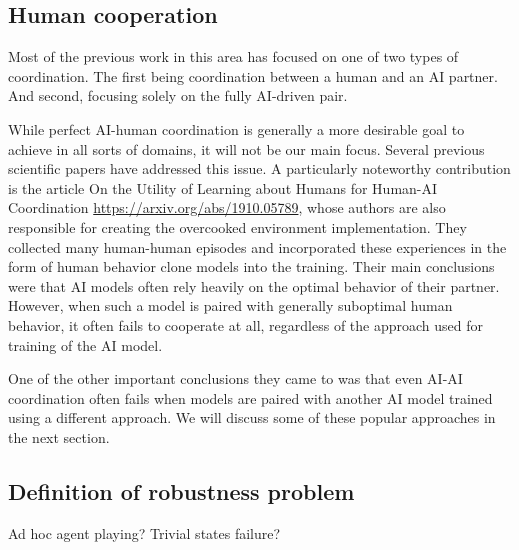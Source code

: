 \subsection{Human cooperation}
Most of the previous work in this area has focused on one of two types of coordination. 
The first being coordination between a human and an AI partner. 
And second, focusing solely on the fully AI-driven pair.

\par

While perfect AI-human coordination is generally a more desirable goal to achieve in all sorts of domains, it will not be our main focus.  
Several previous scientific papers have addressed this issue. A particularly noteworthy contribution is the article 
On the Utility of Learning about Humans for Human-AI Coordination
\url{https://arxiv.org/abs/1910.05789}, whose authors are also responsible for creating the overcooked environment implementation. 
They collected many human-human episodes and incorporated these experiences in the form of human behavior clone models into the training. Their main conclusions were that AI models often rely heavily on the optimal behavior of their partner. 
However, when such a model is paired with generally suboptimal human behavior, it often fails to cooperate at all, regardless of the approach used for training of the AI model.

One of the other important conclusions they came to was that even AI-AI coordination often fails when models are paired with another AI model trained using a different approach. 
We will discuss some of these popular approaches in the next section.



\subsection*{Definition of robustness problem}
Ad hoc agent playing? Trivial states failure?


